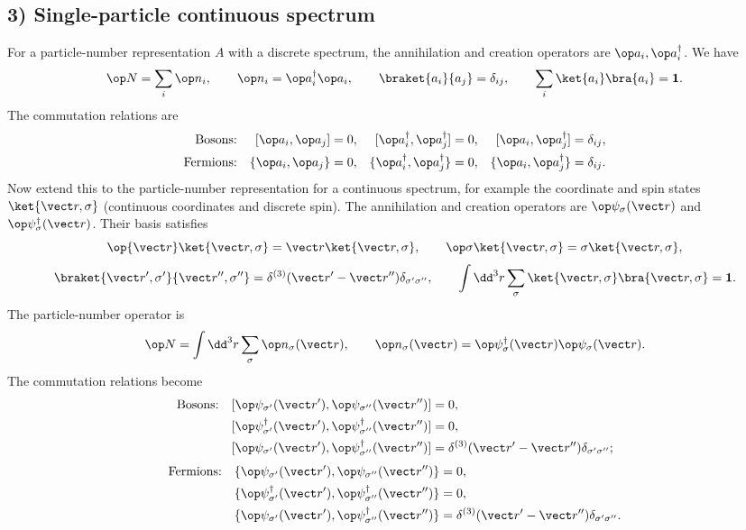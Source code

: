 \subsection*{3) Single-particle continuous spectrum}
For a particle-number representation $A$ with a discrete spectrum, the annihilation and creation operators are $\op a_i,\op a_i^\dagger$. We have
\[\op N=\sum_i\op n_i,\qquad \op n_i=\op a_i^\dagger\op a_i,\qquad
\braket{a_i}{a_j}=\delta_{ij},\qquad \sum_i\ket{a_i}\bra{a_i}=\mathbf1.\]
The commutation relations are
\begin{align*}
\text{Bosons:}&&
[\op a_i,\op a_j]&=0,&
[\op a_i^\dagger,\op a_j^\dagger]&=0,&
[\op a_i,\op a_j^\dagger]&=\delta_{ij},\\
\text{Fermions:}&&
\{\op a_i,\op a_j\}&=0,&
\{\op a_i^\dagger,\op a_j^\dagger\}&=0,&
\{\op a_i,\op a_j^\dagger\}&=\delta_{ij}.
\end{align*}
Now extend this to the particle-number representation for a continuous spectrum, for example the coordinate and spin states $\ket{\vect r,\sigma}$ (continuous coordinates and discrete spin). The annihilation and creation operators are $\op\psi_\sigma(\vect r)$ and $\op\psi_\sigma^\dagger(\vect r)$. Their basis satisfies
\[\op{\vect r}\ket{\vect r,\sigma}=\vect r\ket{\vect r,\sigma},\qquad
\op\sigma\ket{\vect r,\sigma}=\sigma\ket{\vect r,\sigma},\]
\[\braket{\vect r',\sigma'}{\vect r'',\sigma''}
=\delta^{(3)}(\vect r'-\vect r'')\delta_{\sigma'\sigma''},\qquad
\int\dd^3r\sum_\sigma\ket{\vect r,\sigma}\bra{\vect r,\sigma}=\mathbf1.\]
The particle-number operator is
\[\op N=\int\dd^3r\sum_\sigma\op n_\sigma(\vect r),\qquad
\op n_\sigma(\vect r)=\op\psi_\sigma^\dagger(\vect r)\op\psi_\sigma(\vect r).\]
The commutation relations become
\begin{align*}
\text{Bosons:}\quad
[\op\psi_{\sigma'}(\vect r'),\op\psi_{\sigma''}(\vect r'')]&=0,\\
[\op\psi_{\sigma'}^\dagger(\vect r'),\op\psi_{\sigma''}^\dagger(\vect r'')]&=0,\\
[\op\psi_{\sigma'}(\vect r'),\op\psi_{\sigma''}^\dagger(\vect r'')]
&=\delta^{(3)}(\vect r'-\vect r'')\delta_{\sigma'\sigma''};
\end{align*}
\begin{align*}
\text{Fermions:}\quad
\{\op\psi_{\sigma'}(\vect r'),\op\psi_{\sigma''}(\vect r'')\}&=0,\\
\{\op\psi_{\sigma'}^\dagger(\vect r'),\op\psi_{\sigma''}^\dagger(\vect r'')\}&=0,\\
\{\op\psi_{\sigma'}(\vect r'),\op\psi_{\sigma''}^\dagger(\vect r'')\}
&=\delta^{(3)}(\vect r'-\vect r'')\delta_{\sigma'\sigma''}.
\end{align*}
